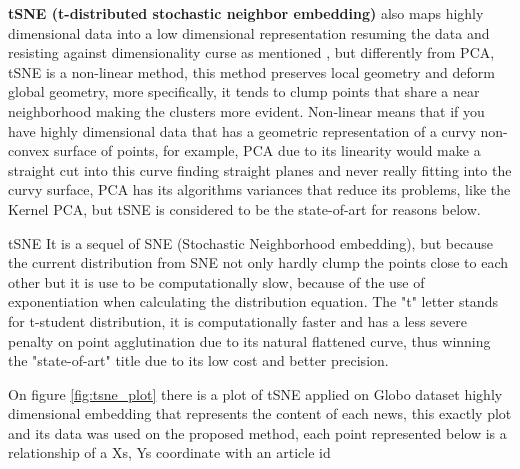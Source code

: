 \documentclass[ecp,tc,english]{iiufrgs}
\begin{document}
    \textbf{tSNE (t-distributed stochastic neighbor embedding)} also maps highly dimensional data into a low dimensional representation resuming the data and resisting against dimensionality curse as mentioned \cite{marimont1979}, but differently from PCA, tSNE \cite{maaten2008} is a non-linear method, this method preserves local geometry and deform global geometry, more specifically, it tends to clump points that share a near neighborhood making the clusters more evident.
    Non-linear means that if you have highly dimensional data that has a geometric representation of a curvy non-convex surface of points, for example, PCA due to its linearity would make a straight cut into this curve finding straight planes and never really fitting into the curvy surface, PCA has its algorithms variances that reduce its problems, like the Kernel PCA, but tSNE is considered to be the state-of-art for reasons below.

    tSNE It is a sequel of SNE (Stochastic Neighborhood embedding), but because the current distribution from SNE not only hardly clump the points close to each other but it is use to be computationally slow, because of the use of exponentiation when calculating the distribution equation.
    The "t" letter stands for t-student distribution, it is computationally faster and has a less severe penalty on point agglutination due to its natural flattened curve, thus winning the "state-of-art" title due to its low cost and better precision.

    On figure \ref{fig:tsne_plot} there is a plot of tSNE applied on Globo dataset highly dimensional embedding that represents the content of each news, this exactly plot and its data was used on the proposed method, each point represented below is a relationship of a Xs, Ys coordinate with an article id 
\end{document}
